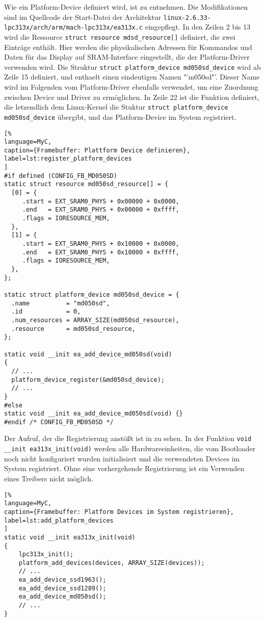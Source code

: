 Wie ein Platform-Device definiert wird, ist  zu entnehmen. Die Modifikationen sind im Quellcode der Start-Datei der Architektur \lstinline|linux-2.6.33-lpc313x/arch/arm/mach-lpc313x/ea313x.c| eingepflegt. In den Zeilen 2 bis 13 wird die Ressource \lstinline|struct resource mdsd_resource[]| definiert, die zwei Einträge enthält. Hier werden die physikalischen Adressen für Kommandos und Daten  für das Display auf SRAM-Interface eingestellt, die der Platform-Driver verwenden wird. Die Struktur \lstinline|struct platform_device md050sd_device| wird ab Zeile 15 definiert, und enthaelt einen eindeutigen Namen "'m050sd"'. Dieser Name wird im Folgenden vom Platform-Driver ebenfalls verwendet, um eine Zuordnung zwischen Device und Driver zu ermöglichen.
In Zeile 22 ist die Funktion definiert, die letzendlich dem Linux-Kernel die Stuktur \lstinline|struct platform_device md050sd_device| übergibt, und das Platform-Device im System registriert. 
\begin{lstlisting}[%
language=MyC,
caption={Framebuffer: Plattform Device definieren},
label=lst:register_platform_devices
]
#if defined (CONFIG_FB_MD050SD)
static struct resource md050sd_resource[] = {
  [0] = {
     .start = EXT_SRAM0_PHYS + 0x00000 + 0x0000,
     .end   = EXT_SRAM0_PHYS + 0x00000 + 0xffff,
     .flags = IORESOURCE_MEM,
  },
  [1] = {
     .start = EXT_SRAM0_PHYS + 0x10000 + 0x0000,
     .end   = EXT_SRAM0_PHYS + 0x10000 + 0xffff,
     .flags = IORESOURCE_MEM,
  },
};

static struct platform_device md050sd_device = {
  .name          = "md050sd",
  .id            = 0,
  .num_resources = ARRAY_SIZE(md050sd_resource),
  .resource      = md050sd_resource,
};

static void __init ea_add_device_md050sd(void)
{
  // ...
  platform_device_register(&md050sd_device);
  // ...
}
#else
static void __init ea_add_device_md050sd(void) {}
#endif /* CONFIG_FB_MD050SD */
\end{lstlisting}
Der Aufruf, der die Registrierung anstößt ist in  zu sehen. In der Funktion \lstinline|void __init ea313x_init(void)| werden alle Hardwareeinheiten, die vom Bootloader noch nicht konfiguriert wurden initialisiert und die verwendeten Devices im System registriert. Ohne eine vorhergehende Registrierung ist ein Verwenden eines Treibers nicht möglich.

\begin{lstlisting}[%
language=MyC,
caption={Framebuffer: Platform Devices im System registrieren},
label=lst:add_platform_devices
]
static void __init ea313x_init(void)
{
	lpc313x_init();
	platform_add_devices(devices, ARRAY_SIZE(devices));
    // ...
	ea_add_device_ssd1963();
	ea_add_device_ssd1289();
	ea_add_device_md050sd();
	// ...
}
\end{lstlisting}

